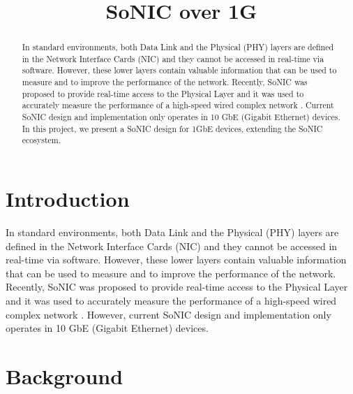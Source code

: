 \documentclass[conference]{IEEEtran}
\begin{document}
%
\title{SoNIC over 1G}


\author{
}

\maketitle


\begin{abstract}

In standard environments, both Data Link and the Physical (PHY) layers are defined in the Network Interface Cards (NIC) and they cannot be accessed in real-time via software. However, these lower layers contain valuable information that can be used to measure and to improve the performance of the network. Recently, SoNIC \cite{lee2013sonic} was proposed to provide real-time access to the Physical Layer and it was used to accurately measure the performance of a high-speed wired complex network \cite{wang2014timing}. Current SoNIC design and implementation only operates in 10 GbE (Gigabit Ethernet) devices. In this project, we present a SoNIC design for 1GbE devices, extending the SoNIC ecosystem.

\end{abstract}

\IEEEpeerreviewmaketitle

\section{Introduction}

In standard environments, both Data Link and the Physical (PHY) layers are defined in the Network Interface Cards (NIC) and they cannot be accessed in real-time via software. However, these lower layers contain valuable information that can be used to measure and to improve the performance of the network. Recently, SoNIC \cite{lee2013sonic} was proposed to provide real-time access to the Physical Layer and it was used to accurately measure the performance of a high-speed wired complex network \cite{wang2014timing}. However, current SoNIC design and implementation only operates in 10 GbE (Gigabit Ethernet) devices. 

\section{Background}
\end{document}
